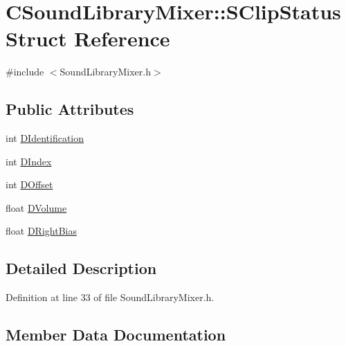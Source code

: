 \hypertarget{structCSoundLibraryMixer_1_1SClipStatus}{}\section{C\+Sound\+Library\+Mixer\+:\+:S\+Clip\+Status Struct Reference}
\label{structCSoundLibraryMixer_1_1SClipStatus}


{\ttfamily \#include $<$Sound\+Library\+Mixer.\+h$>$}

\subsection*{Public Attributes}
\begin{DoxyCompactItemize}
\item 
int \hyperlink{structCSoundLibraryMixer_1_1SClipStatus_a00713757eef221d6e5c063ef4c9d47ce}{D\+Identification}
\item 
int \hyperlink{structCSoundLibraryMixer_1_1SClipStatus_a816de7bb8f6d975ec56008d56826050d}{D\+Index}
\item 
int \hyperlink{structCSoundLibraryMixer_1_1SClipStatus_af1fd7d320df05e7ac19306352c02ffb6}{D\+Offset}
\item 
float \hyperlink{structCSoundLibraryMixer_1_1SClipStatus_a2f44b601fef18f411ec68fb0da7ee1cf}{D\+Volume}
\item 
float \hyperlink{structCSoundLibraryMixer_1_1SClipStatus_a260c67e2b8881a674e4ebbffbdba6194}{D\+Right\+Bias}
\end{DoxyCompactItemize}


\subsection{Detailed Description}


Definition at line 33 of file Sound\+Library\+Mixer.\+h.



\subsection{Member Data Documentation}
\hypertarget{structCSoundLibraryMixer_1_1SClipStatus_a00713757eef221d6e5c063ef4c9d47ce}{}\label{structCSoundLibraryMixer_1_1SClipStatus_a00713757eef221d6e5c063ef4c9d47ce} 
